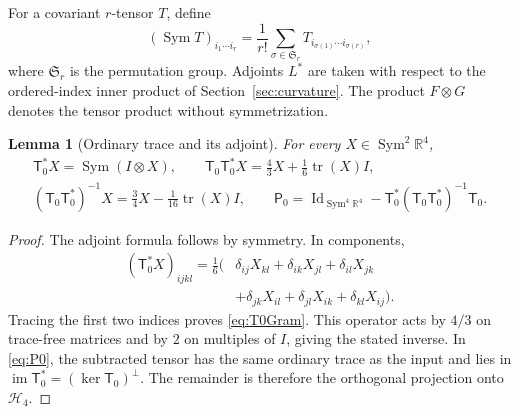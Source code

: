 \documentclass[11pt,a4paper]{amsart}
\numberwithin{equation}{section}
\newtheorem{lemma}[theorem]{Lemma}
\theoremstyle{definition}
\theoremstyle{remark}
\DeclareMathOperator{\tr}{tr}
\DeclareMathOperator{\Sym}{Sym}
\newcommand{\R}{\mathbb R}
\newcommand{\T}{\mathsf T}
\newcommand{\Pz}{\mathsf P_0}
\newcommand{\Hfour}{\mathscr H_4}
\begin{document}
For a covariant $r$-tensor $T$, define
\[
 (\Sym T)_{i_1\cdots i_r}
 =\frac1{r!}\sum_{\sigma\in\mathfrak S_r}
 T_{i_{\sigma(1)}\cdots i_{\sigma(r)}},
\]
where $\mathfrak S_r$ is the permutation group.
Adjoints $L^*$ are taken with respect to the ordered-index inner product
of Section~\ref{sec:curvature}. The product $F\otimes G$ denotes the
tensor product without symmetrization.

\begin{lemma}[Ordinary trace and its adjoint]\label{lem:T0}
For every $X\in\Sym^2\R^4$,
\begin{gather}
 \T_0^*X=\Sym(I\otimes X),\qquad
 \T_0\T_0^*X=\tfrac43X+\tfrac16\tr(X)I,\label{eq:T0Gram}\\
 (\T_0\T_0^*)^{-1}X=\tfrac34X-\tfrac1{16}\tr(X)I,\qquad
 \Pz=\operatorname{Id}_{\Sym^4\R^4}-\T_0^*(\T_0\T_0^*)^{-1}\T_0.\label{eq:P0}
\end{gather}
\end{lemma}
\begin{proof}
The adjoint formula follows by symmetry. In components,
\begin{align*}
 (\T_0^*X)_{ijkl}=\tfrac16(&\delta_{ij}X_{kl}+\delta_{ik}X_{jl}
 +\delta_{il}X_{jk}\\
 &+\delta_{jk}X_{il}+\delta_{jl}X_{ik}+\delta_{kl}X_{ij}).
\end{align*}
Tracing the first two indices proves \eqref{eq:T0Gram}.
This operator acts by $4/3$ on trace-free matrices and by $2$ on
multiples of $I$, giving the stated inverse.
In \eqref{eq:P0}, the subtracted tensor has the same ordinary trace
as the input and lies in $\operatorname{im}\T_0^*=(\ker\T_0)^\perp$.
The remainder is therefore the orthogonal projection onto $\Hfour$.
\end{proof}
\end{document}
